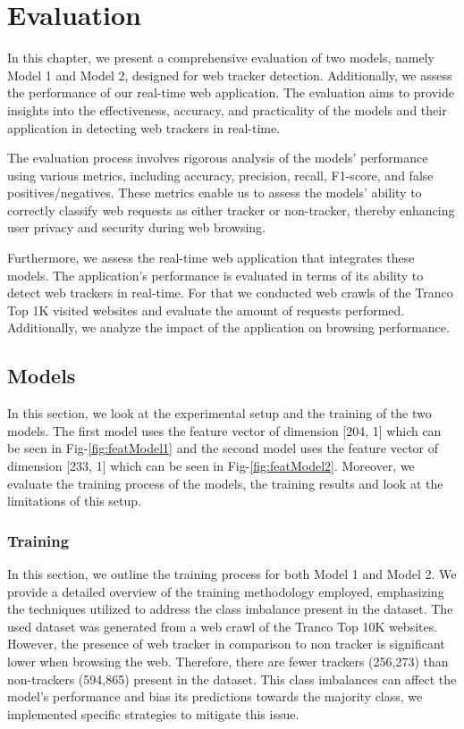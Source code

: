 \chapter{Evaluation}
In this chapter, we present a comprehensive evaluation of two models, namely Model 1 and Model 2, designed for web tracker detection.
Additionally, we assess the performance of our real-time web application. The evaluation aims to provide insights into the effectiveness,
accuracy, and practicality of the models and their application in detecting web trackers in real-time.

The evaluation process involves rigorous analysis of the models' performance using various metrics, including accuracy, precision,
recall, F1-score, and false positives/negatives. These metrics enable us to assess the models' ability to correctly classify web
requests as either tracker or non-tracker, thereby enhancing user privacy and security during web browsing.

Furthermore, we assess the real-time web application that integrates these models. The application's performance is evaluated in
terms of its ability to detect web trackers in real-time. For that we conducted web crawls of the Tranco Top 1K visited websites
and evaluate the amount of requests performed. Additionally, we analyze the impact of the application on browsing performance.
\section{Models}
In this section, we look at the experimental setup and the training of the two models. The first model uses the feature vector of dimension [204, 1] 
which can be seen in Fig-\ref{fig:featModel1} and the second model uses the feature vector of dimension [233, 1]
which can be seen in Fig-\ref{fig:featModel2}. Moreover, we evaluate the training process of the models, the training results and look
at the limitations of this setup.

\subsection{Training}
In this section, we outline the training process for both Model 1 and Model 2.
We provide a detailed overview of the training methodology employed, emphasizing the techniques utilized to address
the class imbalance present in the dataset. The used dataset was generated from a web crawl of the Tranco Top 10K websites. 
However, the presence of web tracker in comparison to non tracker is significant lower when browsing the web. Therefore,
there are fewer trackers (256,273) than non-trackers (594,865) present in the dataset. This class imbalances can affect the
model's performance and bias its predictions towards the majority class, we implemented specific strategies to mitigate this issue.


